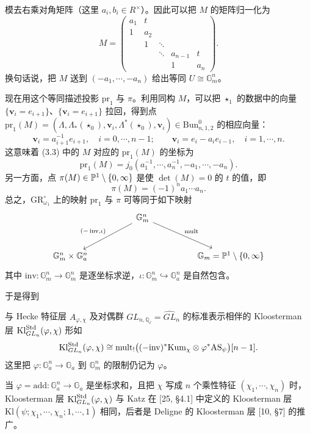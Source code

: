 模去右乘对角矩阵（这里 $a_i,b_i\in R^\times$）。因此可以把 $M$ 的矩阵归一化为
\begin{equation}
M=\begin{pmatrix}
a_1 & t & & \\
1 & a_2 & & \\
& 1 & \ddots & \\
& & \ddots & a_{n-1} & t\\
& & & 1 & a_n
\end{pmatrix}.
\end{equation}
换句话说，把 $M$ 送到 $(-a_1,\cdots,-a_n)$ 给出等同 $U\cong\mathbb{G}_m^n$。

现在用这个等同描述投影 $\mathrm{pr}_1$ 与 $\pi$。利用同构 $M$，可以把 $\star_1$ 的数据中的向量 $\{\mathbf v_i=e_{i+1}\}$、$\{\mathbf v_i=e_{i+1}\}$ 拉回，得到点 $\mathrm{pr}_1(M)=(\Lambda,\Lambda_*(\star_0),\mathbf v_i,\Lambda^*(\star_0),\mathbf v_i)\in\mathrm{Bun}^0_{n,1,2}$ 的相应向量：
\[
\mathbf v_i=a_{i+1}^{-1}e_{i+1},\quad i=0,\cdots,n-1;\qquad
\mathbf v_i=e_i-a_ie_{i-1},\quad i=1,\cdots,n.
\]
这意味着 (3.3) 中的 $M$ 对应的 $\mathrm{pr}_1(M)$ 的坐标为
\[
\mathrm{pr}_1(M)=j_0(a_1^{-1},\cdots,a_n^{-1},-a_1,\cdots,-a_n).
\]
另一方面，点 $\pi(M)\in\mathbb{P}^1\setminus\{0,\infty\}$ 是使 $\det(M)=0$ 的 $t$ 的值，即
\[
\pi(M)=(-1)^na_1\cdots a_n.
\]
总之，$\mathrm{GR}^\circ_{\omega_1}$ 上的映射 $\mathrm{pr}_1$ 与 $\pi$ 可等同于如下映射
\[
\begin{tikzcd}[column sep=huge, row sep=large]
& \mathbb{G}_m^n \arrow[dl, "{(-\operatorname{inv},\iota)}"'] \arrow[dr, "\operatorname{mult}"] & \\
\mathbb{G}_m^n\times\mathbb{G}_a^n & & \mathbb{G}_m=\PP^1\setminus\{0,\infty\}
\end{tikzcd}
\]
其中 $\mathrm{inv}:\mathbb{G}_m^n\to\mathbb{G}_m^n$ 是逐坐标求逆，$\iota:\mathbb{G}_m^n\hookrightarrow\mathbb{G}_a^n$ 是自然包含。

于是得到

\begin{proposition}
与 Hecke 特征层 $A_{\varphi,\chi}$ 及对偶群 $GL_{n,\mathbb{Q}_\ell}=\widehat{GL}_n$ 的标准表示相伴的 Kloosterman 层 $\mathrm{Kl}^{\mathrm{Std}}_{GL_n}(\varphi,\chi)$ 形如
\[
\mathrm{Kl}^{\mathrm{Std}}_{GL_n}(\varphi,\chi)\cong\mathrm{mult}_!\big((-\mathrm{inv})^*\mathrm{Kum}_\chi\otimes\varphi^*\mathrm{AS}_\psi\big)[n-1].
\]
这里把 $\varphi:\mathbb{G}_a^n\to\mathbb{G}_a$ 到 $\mathbb{G}_m^n$ 的限制仍记为 $\varphi$。
\end{proposition}

\begin{remark}
当 $\varphi=\mathrm{add}:\mathbb{G}_a^n\to\mathbb{G}_a$ 是坐标求和，且把 $\chi$ 写成 $n$ 个乘性特征 $(\chi_1,\cdots,\chi_n)$ 时，Kloosterman 层 $\mathrm{Kl}^{\mathrm{Std}}_{GL_n}(\varphi,\chi)$ 与 Katz 在 [25, §4.1] 中定义的 Kloosterman 层 $\mathrm{Kl}(\psi;\chi_1,\cdots,\chi_n;1,\cdots,1)$ 相同，后者是 Deligne 的 Kloosterman 层 [10, §7] 的推广。
\end{remark}
